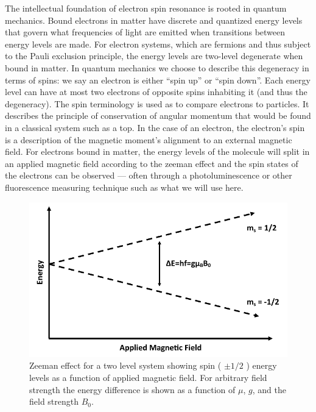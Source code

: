 \documentclass[oneside]{BYUPhys}
\begin{document}
The intellectual foundation of electron spin resonance is rooted in quantum mechanics. Bound electrons in matter have discrete and quantized energy levels that govern what frequencies of light are emitted when transitions between energy levels are made. For electron systems, which are fermions and thus subject to the Pauli exclusion principle, the energy levels are two-level degenerate when bound in matter. In quantum mechanics we choose to describe this degeneracy in terms of spins: we say an electron is either ``spin up'' or ``spin down''. Each energy level can have at most two electrons of opposite spins inhabiting it (and thus the degeneracy). The spin terminology is used as to compare electrons to particles. It describes the principle of conservation of angular momentum that would be found in a classical system such as a top. In the case of an electron, the electron's spin is a description of the magnetic moment's alignment to an external magnetic field. For electrons bound in matter, the energy levels of the molecule will split in an applied magnetic field according to the zeeman effect and the spin states of the electrons can be observed --- often through a photoluminescence or other fluorescence measuring technique such as what we will use here.

\begin{figure}[h]
    \centerline{\includegraphics{zeeman_fig}}
    \caption[Zeeman Effect and Resonant Conditions in Matter]{\label{fig:Zeeman}
     Zeeman effect for a two level system showing spin ( $\pm 1/2$ ) energy levels as a function of applied magnetic field. For arbitrary field strength the energy difference is shown as a function of $\mu$, $g$, and the field strength $B_0$.}
\end{figure}
\end{document}
